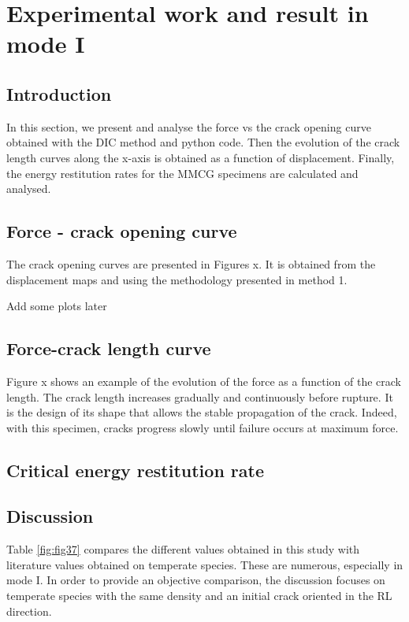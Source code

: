 \chapter{Experimental work and result in mode I}
\label{Chapter3}

\section{Introduction}

In this section, we present and analyse the force vs the crack opening curve obtained with the DIC method and python code.  Then the evolution of the crack length curves along the x-axis is obtained as a function of displacement. Finally, the energy restitution rates for the MMCG specimens are calculated and analysed.

\section{Force - crack opening curve}

The crack opening curves are presented in Figures x. It is obtained from the displacement maps and using the methodology presented in method 1.

Add some plots later

\section{Force-crack length curve}

Figure x shows an example of the evolution of the force as a function of the crack length. The crack length increases gradually and continuously before rupture. It is the design of its shape that allows the stable propagation of the crack. Indeed, with this specimen, cracks progress slowly until failure occurs at maximum force.

\section{Critical energy restitution rate}

\section{Discussion}

Table \ref{fig:fig37} compares the different values obtained in this study with literature values obtained on temperate species. These are numerous, especially in mode I. In order to provide an objective comparison, the discussion focuses on temperate species with the same density and an initial crack oriented in the RL direction.



